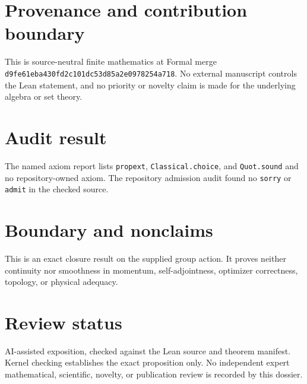 \documentclass[11pt]{article}
\begin{document}
\section{Provenance and contribution boundary}
This is source-neutral finite mathematics at Formal merge
\texttt{d9fe61eba430fd2c101dc53d85a2e0978254a718}.  No external manuscript controls the Lean statement, and no priority or
novelty claim is made for the underlying algebra or set theory.

\section{Audit result}
The named axiom report lists \texttt{propext}, \texttt{Classical.choice}, and
\texttt{Quot.sound} and no repository-owned axiom.  The repository admission audit found no
\texttt{sorry} or \texttt{admit} in the checked source.

\section{Boundary and nonclaims}
This is an exact closure result on the supplied group action.  It proves neither continuity nor smoothness in momentum, self-adjointness, optimizer correctness, topology, or physical adequacy.

\section{Review status}
AI-assisted exposition, checked against the Lean source and theorem manifest.  Kernel checking
establishes the exact proposition only.  No independent expert mathematical, scientific,
novelty, or publication review is recorded by this dossier.
\end{document}
